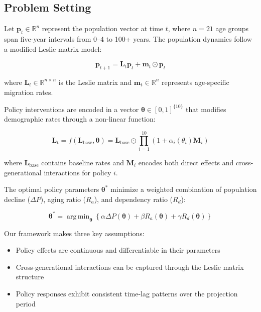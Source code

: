 \documentclass{article} %
\DeclareMathOperator*{\argmin}{arg\,min}
\begin{document}
\subsection{Problem Setting}
\label{subsec:problem}

Let $\mathbf{p}_t \in \mathbb{R}^n$ represent the population vector at time $t$, where $n=21$ age groups span five-year intervals from 0--4 to 100+ years. The population dynamics follow a modified Leslie matrix model:

\begin{equation}
\mathbf{p}_{t+1} = \mathbf{L}_t\mathbf{p}_t + \mathbf{m}_t \odot \mathbf{p}_t
\end{equation}

where $\mathbf{L}_t \in \mathbb{R}^{n \times n}$ is the Leslie matrix and $\mathbf{m}_t \in \mathbb{R}^n$ represents age-specific migration rates.

Policy interventions are encoded in a vector $\boldsymbol{\theta} \in [0,1]^{\{10\}}$ that modifies demographic rates through a non-linear function:

\begin{equation}
\mathbf{L}_t = f(\mathbf{L}_{\text{base}}, \boldsymbol{\theta}) = \mathbf{L}_{\text{base}} \odot \prod_{i=1}^{10} (1 + \alpha_i(\theta_i)\mathbf{M}_i)
\end{equation}

where $\mathbf{L}_{\text{base}}$ contains baseline rates and $\mathbf{M}_i$ encodes both direct effects and cross-generational interactions for policy $i$.

The optimal policy parameters $\boldsymbol{\theta}^*$ minimize a weighted combination of population decline ($\Delta P$), aging ratio ($R_a$), and dependency ratio ($R_d$):

\begin{equation}
\boldsymbol{\theta}^* = \argmin_{\boldsymbol{\theta}} \left\{ \alpha\Delta P(\boldsymbol{\theta}) + \beta R_a(\boldsymbol{\theta}) + \gamma R_d(\boldsymbol{\theta}) \right\}
\end{equation}

Our framework makes three key assumptions:
\begin{itemize}
    \item Policy effects are continuous and differentiable in their parameters
    \item Cross-generational interactions can be captured through the Leslie matrix structure
    \item Policy responses exhibit consistent time-lag patterns over the projection period
\end{itemize}
\end{document}
